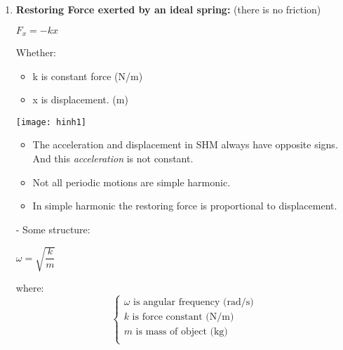 \documentclass[10pt]{article}
\begin{document}
	\begin{enumerate}
		\item \textbf{Restoring Force exerted by an ideal spring:} (there is no friction) \\
		\begin{mybox}
			\begin{center}
				$F_{x} = -kx$
			\end{center}
		\end{mybox}

		Whether: \\
		\begin{itemize}
			\item k is constant force (N/m)
			\item x is displacement. (m)
		\end{itemize}

		\texttt{[image: hinh1]}
		\bigbreak

		\begin{itemize}
			\item The acceleration and displacement in SHM always have opposite signs. And this \textit{acceleration} is not constant.
			\item Not all periodic motions are simple harmonic.
			\item In simple harmonic the restoring force is proportional to displacement.
		\end{itemize}

		- Some structure: \\
		\begin{mybox}
			\begin{center}
				$\omega = \sqrt{\dfrac{k}{m}}$
			\end{center}
		\end{mybox}
		where: \\
			$$
			\begin{cases}
				\omega \mbox{ is angular frequency (rad/s)} \\
				k \mbox{ is force constant (N/m)} \\
				m \mbox{ is mass of object (kg)} \\
			\end{cases}
			$$


\end{enumerate}
\end{document}
